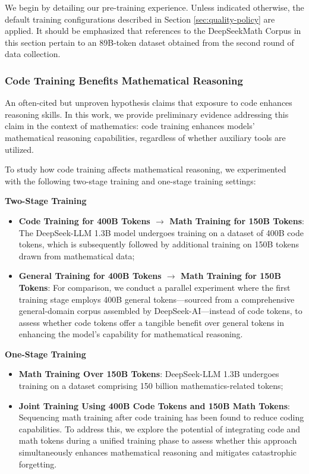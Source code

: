 \begin{itemize}[topsep=0pt]
\begin{itemize}[topsep=0pt]
We begin by detailing our pre-training experience. Unless indicated otherwise, the default training configurations described in Section \ref{sec:quality-policy} are applied. It should be emphasized that references to the DeepSeekMath Corpus in this section pertain to an 89B-token dataset obtained from the second round of data collection.

\subsubsection{Code Training Benefits Mathematical Reasoning}

An often-cited but unproven hypothesis claims that exposure to code enhances reasoning skills. In this work, we provide preliminary evidence addressing this claim in the context of mathematics: code training enhances models’ mathematical reasoning capabilities, regardless of whether auxiliary tools are utilized.

To study how code training affects mathematical reasoning, we experimented with the following two-stage training and one-stage training settings:

\textbf{Two-Stage Training}

\begin{itemize}[topsep=0pt]
    \item \textbf{Code Training for 400B Tokens $\rightarrow$ Math Training for 150B Tokens}: The DeepSeek-LLM 1.3B model undergoes training on a dataset of 400B code tokens, which is subsequently followed by additional training on 150B tokens drawn from mathematical data;
    \item \textbf{General Training for 400B Tokens $\rightarrow$ Math Training for 150B Tokens}: For comparison, we conduct a parallel experiment where the first training stage employs 400B general tokens—sourced from a comprehensive general-domain corpus assembled by DeepSeek-AI—instead of code tokens, to assess whether code tokens offer a tangible benefit over general tokens in enhancing the model’s capability for mathematical reasoning.
\end{itemize}

\textbf{One-Stage Training}

\begin{itemize}[topsep=0pt]
    \item \textbf{Math Training Over 150B Tokens}: DeepSeek-LLM 1.3B undergoes training on a dataset comprising 150 billion mathematics-related tokens;
    \item \textbf{Joint Training Using 400B Code Tokens and 150B Math Tokens}: Sequencing math training after code training has been found to reduce coding capabilities. To address this, we explore the potential of integrating code and math tokens during a unified training phase to assess whether this approach simultaneously enhances mathematical reasoning and mitigates catastrophic forgetting.
\end{itemize}


\end{itemize}
\end{itemize}
